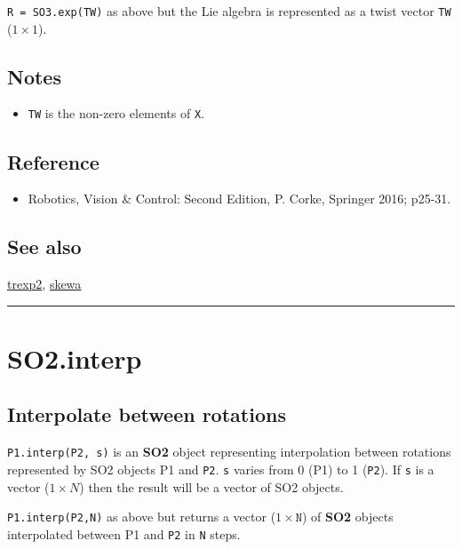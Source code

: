 \texttt{R = SO3.exp(TW)} as above but the Lie algebra is represented
as a twist vector \texttt{TW} ($1 \times 1$).


\subsection*{Notes}
\begin{itemize}
  \item \texttt{TW} is the non-zero elements of \texttt{X}.
\end{itemize}

\subsection*{Reference}
\begin{itemize}
  \item Robotics, Vision \& Control: Second Edition, P. Corke, Springer 2016; p25-31.
\end{itemize}

\subsection*{See also}


\hyperlink{trexp2}{\color{blue} trexp2}, \hyperlink{skewa}{\color{blue} skewa}

\vspace{1.5ex}\hrule

\hypertarget{SO2.interp}{\section*{SO2.interp}}
\subsection*{Interpolate between rotations}


\texttt{P1.interp(P2, s)} is an \textbf{\color{red} SO2} object representing interpolation
between rotations represented by SO2 objects P1 and \texttt{P2}.  \texttt{s} varies from 0
(P1) to 1 (\texttt{P2}). If \texttt{s} is a vector ($1 \times N$) then the result will be a vector
of SO2 objects.



\texttt{P1.interp(P2,N)} as above but returns a vector ($1 \times \texttt{N}$) of \textbf{\color{red} SO2} objects
interpolated between P1 and \texttt{P2} in \texttt{N} steps.


